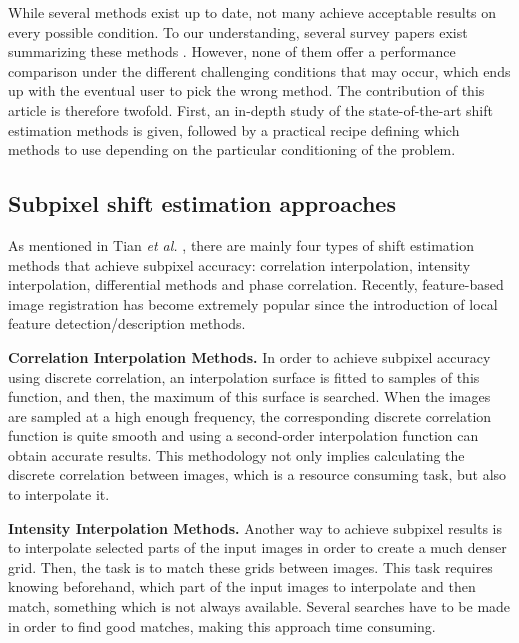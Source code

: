 While several methods exist up to date, not many achieve acceptable results on every possible condition. To our understanding, several survey papers exist summarizing these methods \cite{Tian_1986, Zitova03imageregistration, maintz1998survey, brown1992survey}. However, none of them offer a performance comparison under the different challenging conditions that may occur, which ends up with the eventual user to pick the wrong method. %
The contribution of this article is therefore twofold. First, an in-depth study of the state-of-the-art shift estimation methods is given, followed by a practical recipe defining which methods to use depending on the particular conditioning of the problem.


\subsection{Subpixel shift estimation approaches}
As mentioned in Tian \emph{et al.} \cite{Tian_1986}, there are mainly four types of shift estimation methods that achieve subpixel accuracy: correlation interpolation, intensity interpolation, differential methods and phase correlation. Recently, feature-based image registration has become extremely popular since the introduction of local feature detection/description methods.

{\bf Correlation Interpolation Methods.} In order to achieve subpixel accuracy using discrete correlation, an interpolation surface is fitted to samples of this function, and then, the maximum of this surface is searched. When the images are sampled at a high enough frequency, the corresponding discrete correlation function is quite smooth and using a second-order interpolation function can obtain accurate results. This methodology not only implies calculating the discrete correlation between images, which is a resource consuming task, but also to interpolate it. 

{\bf Intensity Interpolation Methods.} Another way to achieve subpixel results is to interpolate selected parts of the input images in order to create a much denser grid. Then, the task is to match these grids between images. This task requires knowing beforehand, which part of the input images to interpolate and then match, something which is not always available. Several searches have to be made in order to find good matches, making this approach time consuming. %

